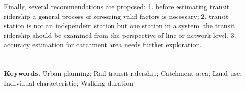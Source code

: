 \documentclass[12pt, twoside, a4paper]{book} %
\begin{document}
Finally, several recommendations are proposed: 1. before estimating transit ridership a general process of screening valid factors is necessary; 2. transit station is not an independent station but one station in a system, the transit ridership should be examined from the perspective of line or network level. 3. accuracy estimation for catchment area needs further exploration. \\ \\ \\

\noindent %
\textbf{Keywords:} Urban planning; Rail transit ridership; Catchment area; Land use; Individual characteristic; Walking duration

\mainmatter %













% 
% 

\backmatter
% 
% 
% 
\end{document}
